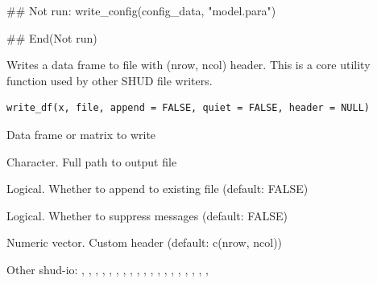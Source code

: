\documentclass[a4paper]{book}
\begin{document}
%
\begin{Examples}
\begin{ExampleCode}
## Not run: 
write_config(config_data, "model.para")

## End(Not run)
\end{ExampleCode}
\end{Examples}
%
\begin{Description}\relax
Writes a data frame to file with (nrow, ncol) header.
This is a core utility function used by other SHUD file writers.
\end{Description}
%
\begin{Usage}
\begin{verbatim}
write_df(x, file, append = FALSE, quiet = FALSE, header = NULL)
\end{verbatim}
\end{Usage}
%
\begin{Arguments}
\begin{ldescription}
\item[\code{x}] Data frame or matrix to write

\item[\code{file}] Character. Full path to output file

\item[\code{append}] Logical. Whether to append to existing file (default: FALSE)

\item[\code{quiet}] Logical. Whether to suppress messages (default: FALSE)

\item[\code{header}] Numeric vector. Custom header (default: c(nrow, ncol))
\end{ldescription}
\end{Arguments}
%
\begin{SeeAlso}\relax
Other shud-io: 
,
,
,
,
,
,
,
,
,
,
,
,
,
,
,
,
,
,
,
\end{SeeAlso}
\end{document}
